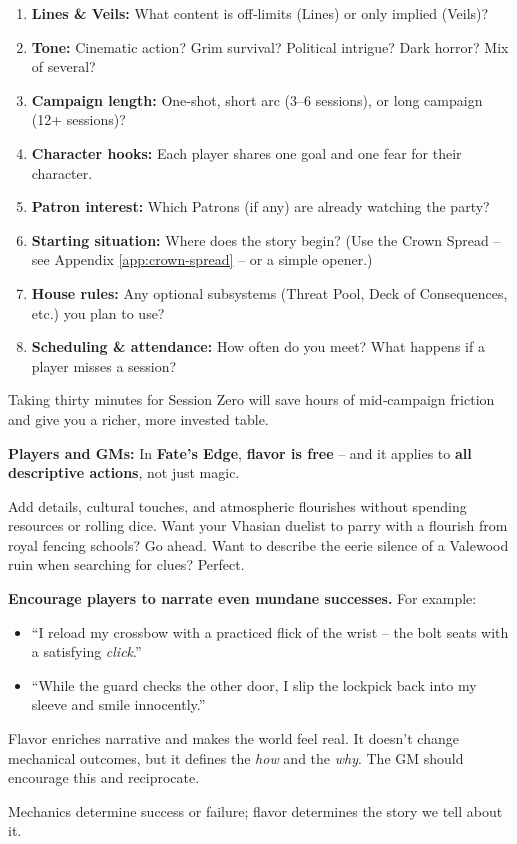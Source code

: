 \begin{enumerate}
    \item \textbf{Lines \& Veils:} What content is off‑limits (Lines) or only implied (Veils)?
    \item \textbf{Tone:} Cinematic action? Grim survival? Political intrigue? Dark horror? Mix of several?
    \item \textbf{Campaign length:} One‑shot, short arc (3–6 sessions), or long campaign (12+ sessions)?
    \item \textbf{Character hooks:} Each player shares one goal and one fear for their character.
    \item \textbf{Patron interest:} Which Patrons (if any) are already watching the party?
    \item \textbf{Starting situation:} Where does the story begin? (Use the Crown Spread – see Appendix \ref{app:crown-spread} – or a simple opener.)
    \item \textbf{House rules:} Any optional subsystems (Threat Pool, Deck of Consequences, etc.) you plan to use?
    \item \textbf{Scheduling \& attendance:} How often do you meet? What happens if a player misses a session?
\end{enumerate}

Taking thirty minutes for Session Zero will save hours of mid‑campaign friction and give you a richer, more invested table.

\begin{tcolorbox}[enhanced, sharp corners, boxrule=1pt, colback=gray!5!white, colframe=gray!75!black, title={Flavor is Free (Even for Mundane Actions)}]
\textbf{Players and GMs:} In \textbf{Fate's Edge}, \textbf{flavor is free} – and it applies to \textbf{all descriptive actions}, not just magic.

Add details, cultural touches, and atmospheric flourishes without spending resources or rolling dice. Want your Vhasian duelist to parry with a flourish from royal fencing schools? Go ahead. Want to describe the eerie silence of a Valewood ruin when searching for clues? Perfect.

\textbf{Encourage players to narrate even mundane successes.} For example:
\begin{itemize}
    \item “I reload my crossbow with a practiced flick of the wrist – the bolt seats with a satisfying \textit{click}.”
    \item “While the guard checks the other door, I slip the lockpick back into my sleeve and smile innocently.”
\end{itemize}
Flavor enriches narrative and makes the world feel real. It doesn’t change mechanical outcomes, but it defines the \emph{how} and the \emph{why}. The GM should encourage this and reciprocate.

Mechanics determine success or failure; flavor determines the story we tell about it.
\end{tcolorbox}


